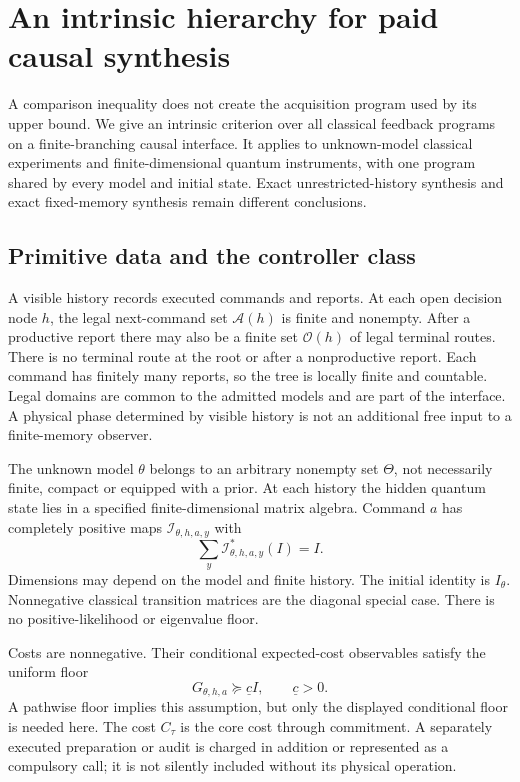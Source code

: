 \section{An intrinsic hierarchy for paid causal synthesis}\label{sec:synthesis}
A comparison inequality does not create the acquisition program used by its upper bound. We give an intrinsic criterion over all classical feedback programs on a finite-branching causal interface. It applies to unknown-model classical experiments and finite-dimensional quantum instruments, with one program shared by every model and initial state. Exact unrestricted-history synthesis and exact fixed-memory synthesis remain different conclusions.

\subsection{Primitive data and the controller class}
A visible history records executed commands and reports. At each open decision node $h$, the legal next-command set $\mathcal A(h)$ is finite and nonempty. After a productive report there may also be a finite set $\mathcal O(h)$ of legal terminal routes. There is no terminal route at the root or after a nonproductive report. Each command has finitely many reports, so the tree is locally finite and countable. Legal domains are common to the admitted models and are part of the interface. A physical phase determined by visible history is not an additional free input to a finite-memory observer.

The unknown model $\theta$ belongs to an arbitrary nonempty set $\Theta$, not necessarily finite, compact or equipped with a prior. At each history the hidden quantum state lies in a specified finite-dimensional matrix algebra. Command $a$ has completely positive maps $\mathcal I_{\theta,h,a,y}$ with
\[
 \sum_y\mathcal I_{\theta,h,a,y}^*(I)=I.
\]
Dimensions may depend on the model and finite history. The initial identity is $I_\theta$. Nonnegative classical transition matrices are the diagonal special case. There is no positive-likelihood or eigenvalue floor.

Costs are nonnegative. Their conditional expected-cost observables satisfy the uniform floor
\begin{equation}\label{eq:syn-cost-floor}
 G_{\theta,h,a}\succeq\underline c I,\qquad \underline c>0.
\end{equation}
A pathwise floor implies this assumption, but only the displayed conditional floor is needed here. The cost $C_\tau$ is the core cost through commitment. A separately executed preparation or audit is charged in addition or represented as a compulsory call; it is not silently included without its physical operation.


